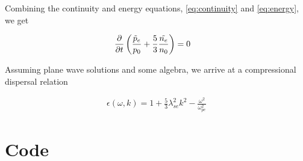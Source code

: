 \documentclass[x11names]{article}
\begin{document}
  Combining the continuity and energy equations, \cref{eq:continuity} and \cref{eq:energy}, we get

  \begin{align}
    \pdv{}{t}\left( \frac{\tilde{p}_e}{p_0} + \frac{5}{3} \frac{\tilde{n_e}}{n_0} \right) &= 0
  \end{align}

  \noindent Assuming plane wave solutions and some algebra, we arrive at a compressional dispersal relation 

  \begin{align}
    \epsilon(\omega, k) = 1 + \frac{5}{3} \lambda_{se}^2k ^2 -  \frac{\omega^2}{\omega_{pe}^2} 
  \end{align}





\section{Code}
  \label{sec:code}
  
\end{document}
